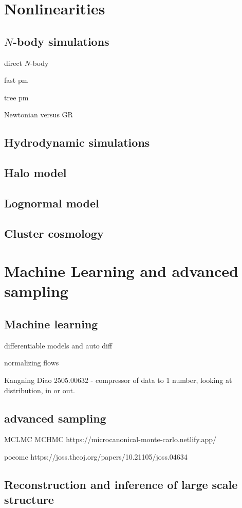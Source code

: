 \chapter{Nonlinearities}
\section{$N$-body simulations}

direct $N$-body

fast pm

tree pm

Newtonian versus GR

\section{Hydrodynamic simulations}


\section{Halo model}

\section{Lognormal model}


\section{Cluster cosmology}

\chapter{Machine Learning and advanced sampling}

\section{Machine learning}

differentiable models and auto diff

normalizing flows

Kangning Diao 2505.00632 - compressor of data to 1 number, looking at distribution, in or out.



\section{advanced sampling}

MCLMC MCHMC   https://microcanonical-monte-carlo.netlify.app/

pocomc
https://joss.theoj.org/papers/10.21105/joss.04634

\section{Reconstruction and inference of large scale structure}

